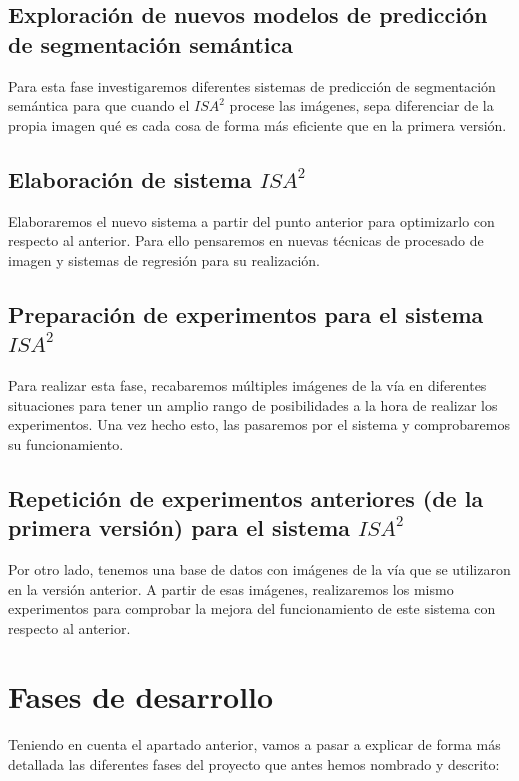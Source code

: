 \documentclass[12pt,oneside,a4paper]{article}
\begin{document}
\subsection{Exploración de nuevos modelos de predicción de segmentación semántica}

Para esta fase investigaremos diferentes sistemas de predicción de segmentación semántica para que cuando el $ISA^2$ procese las imágenes, sepa diferenciar de la propia imagen qué es cada cosa de forma más eficiente que en la primera versión.
\subsection{Elaboración de sistema $ISA^2$}

Elaboraremos el nuevo sistema a partir del punto anterior para optimizarlo con respecto al anterior. Para ello pensaremos en nuevas técnicas de procesado de imagen y sistemas de regresión para su realización.
\subsection{Preparación de experimentos para el sistema $ISA^2$}

Para realizar esta fase, recabaremos múltiples imágenes de la vía en diferentes situaciones para tener un amplio rango de posibilidades a la hora de realizar los experimentos. Una vez hecho esto, las pasaremos por el sistema y comprobaremos su funcionamiento.

\subsection{Repetición de experimentos anteriores (de la primera versión) para el sistema $ISA^2$}

Por otro lado, tenemos una base de datos con imágenes de la vía que se utilizaron en la versión anterior. A partir de esas imágenes, realizaremos los mismo experimentos para comprobar la mejora del funcionamiento de este sistema con respecto al anterior.

\section{Fases de desarrollo}

Teniendo en cuenta el apartado anterior, vamos a pasar a explicar de forma más detallada las diferentes fases del proyecto que antes hemos nombrado y descrito:
\end{document}
